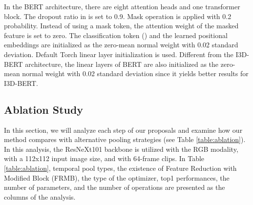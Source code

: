\documentclass[runningheads]{llncs}
\begin{document}
In the BERT architecture, there are eight attention heads and one transformer block. The dropout ratio in  is set to 0.9. Mask operation is applied with 0.2 probability. Instead of using a mask token, the attention weight of the masked feature is set to zero. The classification token () and the learned positional embeddings are initialized as the zero-mean normal weight with 0.02 standard deviation. Default Torch linear layer initialization is used. Different from the I3D-BERT architecture, the linear layers of BERT are also initialized as the zero-mean normal weight with 0.02 standard deviation since it yields better results for I3D-BERT.  

\subsection{Ablation Study}
\label{sec:ablation_study}
In this section, we will analyze each step of our proposals and examine how our method compares with alternative pooling strategies (see Table \ref{table:ablation}). In this analysis, the ResNeXt101 backbone is utilized with the RGB modality, with a 112x112 input image size, and with 64-frame clips. In Table \ref{table:ablation}, temporal pool types, the existence of Feature Reduction with Modified Block (FRMB), the type of the optimizer, top1 performances, the number of parameters, and the number of operations are presented as the columns of the analysis.
\end{document}
